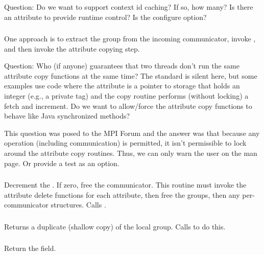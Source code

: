 \documentclass{article}
\begin{document}
Question: Do we want to support context id caching?  If so, how many?
Is there an attribute to provide runtime control?  Is
 the configure option?

\subsubsection{}
One approach is to extract the group from the incoming communicator,
invoke , and then invoke the attribute
copying step.

Question: Who (if anyone) guarantees that two threads don't run the same
attribute copy functions at the same time?  The standard is silent here, but
some examples use code where the attribute is a pointer to storage that holds
an integer (e.g., a private tag) and the copy routine performs (without
locking) a fetch and increment.  Do we want to allow/force the attribute copy
functions to behave like Java synchronized methods?

This question was posed to the MPI Forum and the answer was that
because any operation (including communication) is permitted, it isn't
permissible to lock around the attribute copy routines.  Thus, we can
only warn the user on the man page.  Or provide a test as an option.

\subsubsection{}
Decrement the .  If zero, free the communicator.
This routine must invoke the attribute delete functions for each
attribute, then free the groups, then any per-communicator
structures.  Calls .


\subsubsection{}
\begin{adi3}
  Returns a duplicate (shallow copy) of the local group.  Calls
   to do this. 
\end{adi3}

\subsubsection{}
Return the  field.
\end{document}
